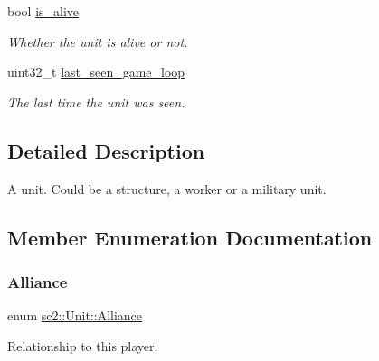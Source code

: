 \begin{DoxyCompactItemize}
\mbox{\label{classsc2_1_1_unit_a5c39436632bf6f82f1a47df3eedbed5d}} 
bool \hyperlink{classsc2_1_1_unit_a5c39436632bf6f82f1a47df3eedbed5d}{is\+\_\+alive}
\begin{DoxyCompactList}\small\item\em Whether the unit is alive or not. \end{DoxyCompactList}\item 
\mbox{\label{classsc2_1_1_unit_af49caa7da174260e424ab4d0c5ae6c78}} 
uint32\+\_\+t \hyperlink{classsc2_1_1_unit_af49caa7da174260e424ab4d0c5ae6c78}{last\+\_\+seen\+\_\+game\+\_\+loop}
\begin{DoxyCompactList}\small\item\em The last time the unit was seen. \end{DoxyCompactList}\end{DoxyCompactItemize}


\subsection{Detailed Description}
A unit. Could be a structure, a worker or a military unit. 

\subsection{Member Enumeration Documentation}
\mbox{\label{classsc2_1_1_unit_a5a40e672e7599d73ef8ef5758bbd7461}} 
\subsubsection{\texorpdfstring{Alliance}{Alliance}}
{\footnotesize\ttfamily enum \hyperlink{classsc2_1_1_unit_a5a40e672e7599d73ef8ef5758bbd7461}{sc2\+::\+Unit\+::\+Alliance}}



Relationship to this player. 

